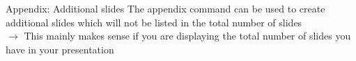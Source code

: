 \documentclass[11pt,t,usepdftitle=false,aspectratio=169]{beamer}
\begin{document}
\appendix
	
	\begin{frame}{Appendix: Additional slides}
		The appendix command can be used to create additional slides which will not be listed in the total number of slides \\
		\medskip
		$\rightarrow$ This mainly makes sense if you are displaying the total number of slides you have in your presentation 
	\end{frame}
\end{document}
